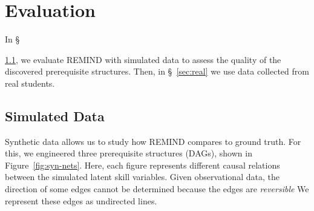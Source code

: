 \documentclass{edm_template}
\begin{document}
\section{Evaluation}
In \S~{\ref{sec:synthetic}, we  evaluate REMIND with simulated data  to assess the quality of the discovered prerequisite structures.
	Then, in \S~\ref{sec:real} we  use  data collected from real students.
	
	
	\subsection{Simulated Data}
	\label{sec:synthetic}
	
	Synthetic data allows us to study how REMIND compares to ground truth.
	For this, we engineered three prerequisite structures (DAGs), shown in Figure~\ref{fig:syn-nets}.
	Here, each figure represents different causal relations between the simulated latent skill variables.
	Given observational data, the direction of some edges cannot be determined because the edges are \emph{reversible}%
	We represent these edges as undirected lines.
	
}
\end{document}
